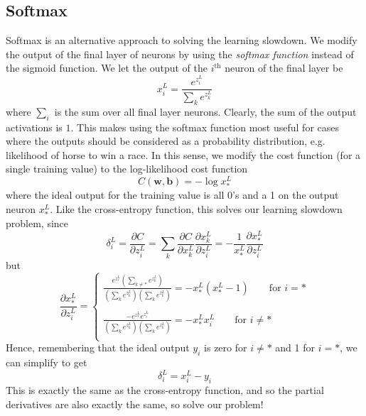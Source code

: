 \documentclass[10pt]{article}
\begin{document}
\subsection{Softmax}
Softmax is an alternative approach to solving the learning slowdown. We modify the output of the final layer of neurons by using the \textit{softmax function} instead of the sigmoid function. We let the output of the $i^{\text{th}}$ neuron of the final layer be
\[
x^{L}_i = \frac{e^{z^L_i}}{\sum_k e^{z^L_k}}
\]
where $\sum_i$ is the sum over all final layer neurons. Clearly, the sum of the output activations is $1$. This makes using the softmax function most useful for cases where the outputs should be considered as a probability distribution, e.g. likelihood of horse to win a race. In this sense, we modify the cost function (for a single training value) to the log-likelihood cost function
\[
C(\mathbf{w},\mathbf{b})= -\log x^L_*
\]
where the ideal output for the training value is all 0's and a 1 on the output neuron $x^L_*$. Like the cross-entropy function, this solves our learning slowdown problem, since
\[
\delta^{L}_i = \frac{\partial C}{\partial z^{L}_i} = \sum_{k} \frac{\partial C}{\partial x^{L}_k} \frac{\partial x^{L}_k}{\partial z^{L}_i}
=
-\frac{1}{x^{L}_*} \frac{\partial x^{L}_*}{\partial z^{L}_i}
\]
but
\[
\frac{\partial x^{L}_*}{\partial z^{L}_i} =
\begin{cases}
\frac{e^{z^L_*}\left( \sum_{k \neq *} e^{z^L_k}\right)}{\left(\sum_k e^{z^L_k}\right) \left(\sum_k e^{z^L_k}\right)} = -x^L_*\left(x^L_* -1\right) \qquad \text{for }i = *\\
\\
\frac{-e^{z^L_*}e^{z^L_i}}{\left(\sum_k e^{z^L_k}\right)\left(\sum_k e^{z^L_k}\right)} = -x^L_* x^L_i \qquad \text{for }i\neq *\\
\end{cases}
\]
Hence, remembering that the ideal output $y_i$ is zero for $i\neq *$ and 1 for $i=*$, we can simplify to get
\[
\delta^{L}_i = x^{L}_i - y_i
\]
This is exactly the same as the cross-entropy function, and so the partial derivatives are also exactly the same, so solve our problem!
\end{document}
